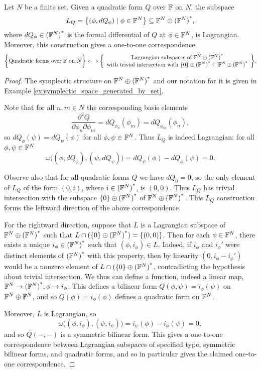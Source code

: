 \begin{proposition} \label{prop:qfls}
  Let $N$ be a finite set. Given a quadratic form $Q$ over ${\mathbb F}$ on $N$, the
  subspace 
  \[ 
    L_Q = \big\{(\phi,dQ_\phi) \mid \phi \in {\mathbb F}^N\big\} \subseteq {{\mathbb F}^{N} \oplus {({\mathbb F}^{N})}^\ast},
  \] 
  where $dQ_\phi \in {({\mathbb F}^N)}^\ast$ is the formal differential of $Q$ at $\phi
  \in {\mathbb F}^N$, is Lagrangian. Moreover, this construction gives a one-to-one correspondence 
  \[ 
    \bigg\{\mbox{Quadratic forms over ${\mathbb F}$ on $N$}\bigg\} \longleftrightarrow
    \bigg\{\begin{array}{c} \mbox{Lagrangian subspaces of ${{\mathbb F}^{N} \oplus {({\mathbb F}^{N})}^\ast}$}\\
      \mbox{with trivial intersection with $\{0\} \oplus {({\mathbb F}^N)}^\ast \subseteq
      {{\mathbb F}^{N} \oplus {({\mathbb F}^{N})}^\ast}$} \end{array} \bigg\}.  
  \]
\end{proposition}
\begin{proof}
  The symplectic structure on ${{\mathbb F}^{N} \oplus {({\mathbb F}^{N})}^\ast}$ and our notation for it is given in
  Example \ref{ex:symplectic_space_generated_by_set}. 

  Note that for all $n,m \in N$ the corresponding basis elements 
  \[
    \frac{\partial^2 Q}{\partial \phi_n \partial \phi_m} = dQ_{\phi_n}(\phi_m) =
    dQ_{\phi_m}(\phi_n),
  \]
  so $dQ_\phi(\psi) = dQ_\psi(\phi)$ for all $\phi,\psi \in {\mathbb F}^N$. Thus $L_Q$ is
  indeed Lagrangian: for all $\phi,\psi \in {\mathbb F}^N$ 
  \[
    \omega\big((\phi,dQ_\phi),(\psi,dQ_\psi)\big) = dQ_\psi(\phi) -
    dQ_\phi(\psi) = 0.
  \]

  Observe also that for all quadratic forms $Q$ we have $dQ_0 = 0$, so the only
  element of $L_Q$ of the form $(0,i)$, where $i \in {({\mathbb F}^N)}^\ast$, is $(0,0)$.
  Thus $L_Q$ has trivial intersection with the subspace $\{0\} \oplus
  {({\mathbb F}^N)}^\ast$ of ${{\mathbb F}^{N} \oplus {({\mathbb F}^{N})}^\ast}$. This $L_Q$ construction forms the leftward
  direction of the above correspondence.

  For the rightward direction, suppose that $L$ is a Lagrangian subspace of
  ${{\mathbb F}^{N} \oplus {({\mathbb F}^{N})}^\ast}$ such that $L \cap (\{0\} \oplus {({\mathbb F}^N)}^\ast) = \{(0,0)\}$. Then
  for each $\phi \in {\mathbb F}^N$, there exists a unique $i_\phi \in {({\mathbb F}^N)}^\ast$
  such that $(\phi,i_\phi) \in L$. Indeed, if $i_\phi$ and $i_\phi'$ were
  distinct elements of ${({\mathbb F}^N)}^\ast$ with this property, then by linearity
  $(0,i_\phi-i_\phi')$ would be a nonzero element of $L \cap (\{0\} \oplus
  {({\mathbb F}^N)}^\ast$, contradicting the hypothesis about trivial intersection. We
  thus can define a function, indeed a linear map, ${\mathbb F}^N \to {({\mathbb F}^N)}^\ast; \phi
  \mapsto i_\phi$. This defines a bilinear form $Q(\phi,\psi) = i_\phi(\psi)$ on
  ${\mathbb F}^N \oplus {\mathbb F}^N$, and so $Q(\phi) = i_\phi(\phi)$ defines a quadratic form
  on ${\mathbb F}^N$. 

  Moreover, $L$ is Lagrangian, so
  \[
    \omega\big((\phi,i_\phi), (\psi,i_\psi)\big) = i_\psi(\phi) - i_\phi(\psi) =
    0,
  \]
  and so $Q(-,-)$ is a symmetric bilinear form. This gives a one-to-one
  correspondence between Lagrangian subspaces of specified type, symmetric
  bilinear forms, and quadratic forms, and so in particular gives the claimed
  one-to-one correspondence. 
\end{proof}

